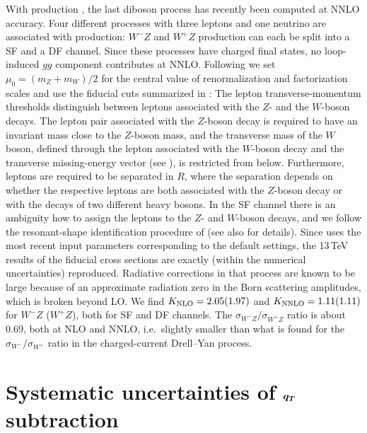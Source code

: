 \documentclass[english,11pt]{article}
\begin{document}
With \wz{} production \cite{Grazzini:2016swo,Grazzini:2017ckn}, the last diboson process
has recently been computed at NNLO accuracy. 
Four different processes with three leptons and one neutrino are associated with 
\wz{} production: $W^-Z$ and $W^+Z$ production can each be split into a SF and a DF channel.
Since these processes have charged final 
states, no loop-induced $gg$ component contributes at NNLO. Following 
 we set $\mu_0=(m_Z+m_W)/2$ for the central value
of renormalization and factorization scales and use 
the fiducial cuts summarized in : The lepton transverse-momentum 
thresholds distinguish between leptons associated with the $Z$- and the $W$-boson decays.
The lepton pair associated with the $Z$-boson decay is required to have an invariant 
mass close to the $Z$-boson mass, and the transverse mass of the $W$ boson, defined through the lepton 
associated with the $W$-boson decay and the transverse missing-energy vector (see ), is 
restricted from below. Furthermore, leptons are required to be separated in $R$, where 
the separation depends on whether the respective leptons are both associated with the $Z$-boson 
decay or with the decays of two different heavy bosons. In the SF channel there is an ambiguity 
how to assign the leptons to the $Z$- and $W$-boson decays, and we follow the 
resonant-shape identification procedure of  (see also  for details).
Since  uses the most recent input parameters 
corresponding to the default 
\Matrix{} settings, the 13\,TeV results of the fiducial cross sections are exactly 
(within the numerical uncertainties) reproduced. 
Radiative corrections in that process are known to be large because of an approximate 
radiation zero \cite{Baur:1994ia} in the Born scattering amplitudes, which is broken beyond LO.
We find $K_{\rm NLO}=2.05(1.97)$ and $K_{\rm NNLO}=1.11(1.11)$ for $W^-Z$ ($W^+Z$), both for SF and DF channels.
The $\sigma_{W^-Z}/\sigma_{W^+Z}$ ratio is about 0.69, both at NLO and NNLO, i.e.\ slightly smaller than what is found for the
$\sigma_{W^-}/\sigma_{W^+}$ ratio in the charged-current Drell--Yan process.

\section{Systematic uncertainties of $\boldsymbol{q_T}$ subtraction}\label{sec:qtsubtraction}
\end{document}
